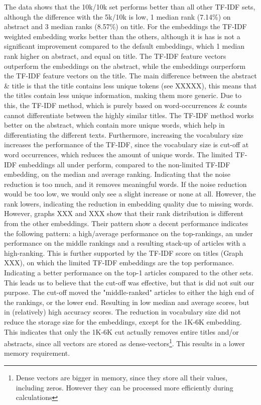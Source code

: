 \documentclass[../../Thesis.tex]{subfiles}
\begin{document}
The data shows that the 10k/10k set performs better than all other TF-IDF sets, although the difference with the 5k/10k is low, 1  median rank (7.14\%) on abstract and 3 median ranks (8.57\%) on title. For the embeddings the TF-IDF weighted embedding works better than the others, although it is has is not a significant improvement compared to the default embeddings, which 1 median rank higher on abstract, and equal on title.
The TF-IDF feature vectors outperform the embeddings on the abstract, while the embeddings ourperform the TF-IDF feature vectors on the title. The main difference between the abstract \& title is that the title contains less unique tokens (see XXXXX), this means that the titles contain less unique information, making them more generic. Due to this, the TF-IDF method, which is purely based on word-occurrences \& counts cannot differentiate between the highly similar titles. The TF-IDF method works better on the abstract, which contain more unique words, which help in differentiating the different texts. Furthermore, increasing the vocabulary size increases the performance of the TF-IDF, since the vocabulary size is cut-off at word occurrences, which reduces the amount of unique words. 
The limited TF-IDF embeddings all under perform, compared to the non-limited TF-IDF embedding, on the median and average ranking. Indicating that the noise reduction is too much, and it removes meaningful words. If the noise reduction would be too low, we would only see a slight increase or none at all. However, the rank lowers, indicating the reduction in embedding quality due to missing words. However, graphs XXX and XXX show that their rank distribution is different from the other embeddings. Their pattern show a decent performance indicates the following pattern: a high/average performance on the top-rankings, an under performance on the middle rankings and  a resulting stack-up of articles with a high-ranking. This is further supported by the TF-IDF score on titles (Graph XXX), on which the limited TF-IDF embeddings are the top performance. Indicating a better performance on the top-1 articles compared to the other sets.\\This leads us to believe that the cut-off was effective, but that is did not suit our purpose. The cut-off moved the "middle-ranked"  articles to either the high end of the rankings, or the lower end. Resulting in low median and average scores, but in (relatively) high accuracy scores. The reduction in vocabulary size did not reduce the storage size for the embeddings, except for the 1K-6K embedding. This indicates that only the 1K-6K cut actually removes entire titles and/or abstracts, since all vectors are stored as dense-vectors\footnote{Dense vectors are bigger in memory, since they store all their values, including zeros. However they can be processed more efficiently during calculations}. This results in a lower memory requirement.
\end{document}
